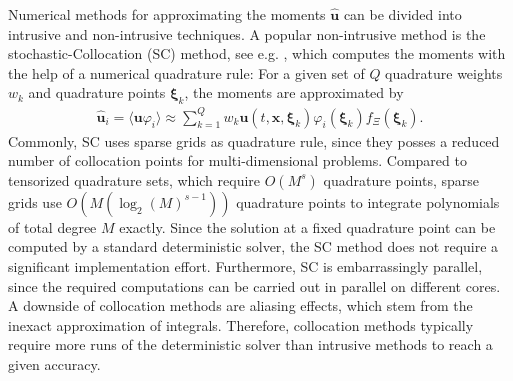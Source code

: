Numerical methods for approximating the moments $\bm{\hat u}$ can be divided into intrusive and non-intrusive techniques. A popular non-intrusive method is the stochastic-Collocation (SC) method, see e.g. \cite{xiu2005high,babuvska2007stochastic,loeven2008probabilistic}, which computes the moments with the help of a numerical quadrature rule: For a given set of $Q$ quadrature weights $w_k$ and quadrature points $\bm{\xi}_k$, the moments are approximated by
\begin{align*}
\bm{\hat u}_i = \langle \bm{u}\varphi_i \rangle \approx \sum_{k = 1}^{Q}w_k \bm{u}({t,\bm{x},\bm{\xi}_k})\varphi_i(\bm{\xi}_k)f_{\Xi}(\bm{\xi}_k).
\end{align*} 
Commonly, SC uses sparse grids as quadrature rule, since they posses a reduced number of collocation points for multi-dimensional problems. Compared to tensorized quadrature sets, which require $O(M^s)$ quadrature points, sparse grids use $O(M(\log_2(M)^{s-1}))$ quadrature points to integrate polynomials of total degree $M$ exactly. 
Since the solution at a fixed quadrature point can be computed by a standard deterministic solver, the SC method does not require a significant implementation effort. Furthermore, SC is embarrassingly parallel, since the required computations can be carried out in parallel on different cores. A downside of collocation methods are aliasing effects, which stem from the inexact approximation of integrals. Therefore, collocation methods typically require more runs of the deterministic solver than intrusive methods \cite{xiu2009fast,alekseev2011estimation} to reach a given accuracy.

